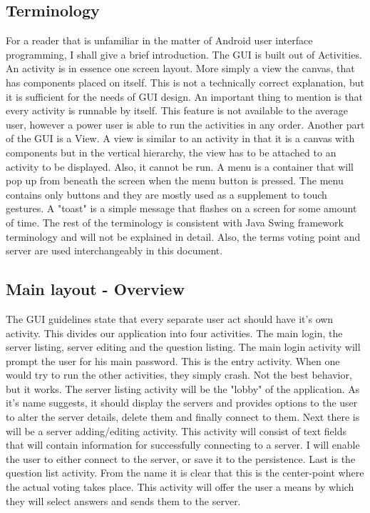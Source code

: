 \documentclass[11pt]{article} %
\begin{document}
\subsection{Terminology}
For a reader that is unfamiliar in the matter of Android user interface programming, I shall  give a brief introduction. The GUI is built out of Activities. An activity is in essence one screen layout. More simply a view the canvas, that has components placed on itself. This is not a technically correct explanation, but it is sufficient for the needs of GUI design. An important thing to mention is that every activity is runnable by itself. This feature is not available to the average user, however a power user is able to run the activities in any order. Another part of the GUI is a View. A view is similar to an activity in that it is a canvas with components but in the vertical hierarchy, the view has to be attached to an activity to be displayed. Also, it cannot be run. A menu is a container that will pop up from beneath the screen when the menu button is pressed. The menu contains only buttons and they are mostly used as a supplement to touch gestures. A "toast" is a simple message that flashes on a screen for some amount of time. The rest of the terminology is consistent with Java Swing framework terminology and will not be explained in detail. Also, the terms voting point and server are used interchangeably in this document.
\subsection{Main layout - Overview}
The GUI guidelines state that every separate user act should have it's own activity. This divides our application into four activities. The main login, the server listing, server editing and the question listing. The main login activity will prompt the user for his main password. This is the entry activity. When one would try to run the other activities, they simply crash. Not the best behavior, but it works. The server listing activity will be the "lobby" of the application. As it's name suggests, it should display the servers and provides options to the user to alter the server details, delete them and finally connect to them. Next there is will be a server adding/editing activity. This activity will consist of text fields that will contain information for successfully connecting to a server. I will enable the user to either connect to the server, or save it to the persistence. Last is the question list activity. From the name it is clear that this is the center-point where the actual voting takes place. This activity will offer the user a means by which they will select answers and sends them to the server.
\end{document}

